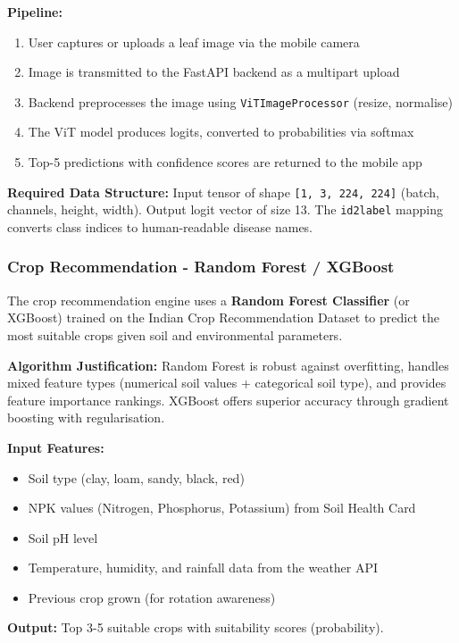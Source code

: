 \documentclass[12pt,a4paper]{article}
\begin{document}
\textbf{Pipeline:}
\begin{enumerate}
    \item User captures or uploads a leaf image via the mobile camera
    \item Image is transmitted to the FastAPI backend as a multipart upload
    \item Backend preprocesses the image using \texttt{ViTImageProcessor} (resize, normalise)
    \item The ViT model produces logits, converted to probabilities via softmax
    \item Top-5 predictions with confidence scores are returned to the mobile app
\end{enumerate}

\textbf{Required Data Structure:} Input tensor of shape \texttt{[1, 3, 224, 224]} (batch, channels, height, width). Output logit vector of size 13. The \texttt{id2label} mapping converts class indices to human-readable disease names.

\subsubsection{Crop Recommendation - Random Forest / XGBoost}
The crop recommendation engine uses a \textbf{Random Forest Classifier} (or XGBoost) trained on the Indian Crop Recommendation Dataset to predict the most suitable crops given soil and environmental parameters.

\textbf{Algorithm Justification:} Random Forest is robust against overfitting, handles mixed feature types (numerical soil values + categorical soil type), and provides feature importance rankings. XGBoost offers superior accuracy through gradient boosting with regularisation.

\textbf{Input Features:}
\begin{itemize}
    \item Soil type (clay, loam, sandy, black, red)
    \item NPK values (Nitrogen, Phosphorus, Potassium) from Soil Health Card
    \item Soil pH level
    \item Temperature, humidity, and rainfall data from the weather API
    \item Previous crop grown (for rotation awareness)
\end{itemize}

\textbf{Output:} Top 3-5 suitable crops with suitability scores (probability).
\end{document}
